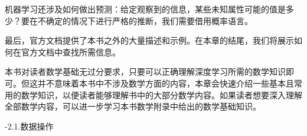 机器学习还涉及如何做出预测：给定观察到的信息，某些未知属性可能的值是多少？要在不确定的情况下进行严格的推断，我们需要借用概率语言。

最后，官方文档提供了本书之外的大量描述和示例。在本章的结尾，我们将展示如何在官方文档中查找所需信息。

本书对读者数学基础无过分要求，只要可以正确理解深度学习所需的数学知识即可。但这并不意味着本书中不涉及数学方面的内容，本章会快速介绍一些基本且常用的数学知识，以便读者能够理解书中的大部分数学内容。如果读者想要深入理解全部数学内容，可以进一步学习本书数学附录中给出的数学基础知识。

-2.1.数据操作
